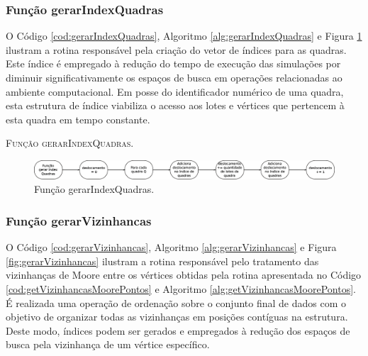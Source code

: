 \subsubsection{Função gerarIndexQuadras}

O Código \ref{cod:gerarIndexQuadras}, Algoritmo \ref{alg:gerarIndexQuadras} e Figura \ref{fig:gerarIndexQuadras} ilustram a rotina responsável pela criação do vetor de índices para as quadras. Este índice é empregado à redução do tempo de execução das simulações por diminuir significativamente os espaços de busca em operações relacionadas ao ambiente computacional. Em posse do identificador numérico de uma quadra, esta estrutura de índice viabiliza o acesso aos lotes e vértices que pertencem à esta quadra em tempo constante. 



\begin{algorithm}[H]
   \SetAlgoLined   
   
   \caption{\textsc{Função gerarIndexQuadras.}}
   \label{alg:gerarIndexQuadras}
\end{algorithm}

\begin{figure}[H]
  \centering
  \includegraphics[width=1\textwidth]{Figuras/Simula/Fluxos/gerarIndexQuadras.eps}
  \caption{Função gerarIndexQuadras.}
  \label{fig:gerarIndexQuadras}
\end{figure} 

\newpage

\subsubsection{Função gerarVizinhancas}

O Código \ref{cod:gerarVizinhancas}, Algoritmo \ref{alg:gerarVizinhancas} e Figura \ref{fig:gerarVizinhancas} ilustram a rotina responsável pelo tratamento das vizinhanças de Moore entre os vértices obtidas pela rotina apresentada no Código \ref{cod:getVizinhancasMoorePontos} e Algoritmo \ref{alg:getVizinhancasMoorePontos}. É realizada uma operação de ordenação sobre o conjunto final de dados com o objetivo de organizar todas as vizinhanças em posições contíguas na estrutura. Deste modo, índices podem ser gerados e empregados à redução dos espaços de busca pela vizinhança de um vértice específico. 

